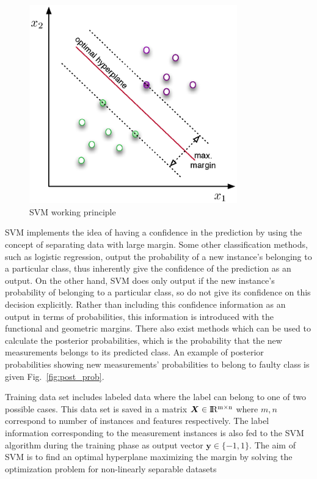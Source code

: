 \begin{figure}
\begin{center}
\includegraphics[width=9cm]{figures/svmHyperplane}    %
\caption{SVM working principle} 
\label{fig:svmHyperplane}
\end{center}
\end{figure}

SVM implements the idea of having a confidence in the prediction by using the concept of separating data with large margin. 
Some other classification methods, such as logistic regression, output the probability of a new instance's belonging to a particular class, thus inherently give the confidence of the prediction as an output. 
On the other hand, SVM does only output if the new instance's probability of belonging to a particular class, so do not give its confidence on this decision explicitly. 
Rather than including this confidence information as an output in terms of probabilities, this information is introduced with the functional and geometric margins. 
There also exist methods which can be used to calculate the posterior probabilities, which is the probability that the new measurements belongs to its predicted class\cite{platt1999probabilistic}. 
An example of posterior probabilities showing new measurements' probabilities to belong to faulty class is given Fig.~\ref{fig:post_prob}. 

Training data set includes labeled data where the label can belong to one of two possible cases. This data set is saved in a matrix $\bm{X} \in {\rm I\!R^{m \times n}}  $ where $m,n$ correspond to number of instances and features respectively. The label information corresponding to the measurement instances is also fed to the SVM algorithm during the training phase as output vector $\bm{y} \in \{-1,1\}$. The aim of SVM is to find an optimal hyperplane maximizing the margin by solving the optimization problem for non-linearly separable datasets

